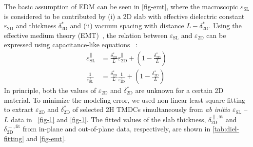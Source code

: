 The basic assumption of EDM can be seen in \autoref{fig-emt},
where the macroscopic $\varepsilon_{\mathrm{SL}}$ is considered to be
contributed by (i) a 2D slab with effective dielectric constant
$\varepsilon_{\mathrm{2D}}$ and thickness $\delta^{*}_{\mathrm{2D}}$
and (ii) vacuum spacing with distance
$L-\delta^{*}_{\mathrm{2D}}$. Using the effective medium theory
(EMT)~\cite{Aspnes_1982_EMT,Markel_2016_EMT}, the relation between
$\varepsilon_{\mathrm{SL}}$ and $\varepsilon_{\mathrm{2D}}$ can be
expressed using capacitance-like
equations~\cite{Matthes_2016_effective_PRB,Laturia_2018_2D_eps} :
\begin{subequations}
  \begin{eqnarray}
    \label{eq:diele-emt-1}
    {\displaystyle \varepsilon_{\mathrm{SL}}^{\parallel}} &= {\displaystyle \frac{\delta^{*}_{\mathrm{2D}}}{L} \varepsilon_{\mathrm{2D}}^{\parallel} + \left(1 - \frac{\delta^{*}_{\mathrm{2D}}}{L} \right)}\\
     \label{eq:diele-emt-2}
    {\displaystyle \frac{1}{\varepsilon_{\mathrm{SL}}^{\perp}}} &= {\displaystyle \frac{\delta^{*}_{\mathrm{2D}}}{L} \frac{1}{\varepsilon_{\mathrm{2D}}^{\perp}} + \left(1 - \frac{\delta^{*}_{\mathrm{2D}}}{L} \right)}
  \end{eqnarray}
\end{subequations}
In principle, both the values of $\varepsilon_{\mathrm{2D}}$ and
$\delta^{*}_{\mathrm{2D}}$ are unknown for a certain 2D material. To
minimize the modeling error, we used non-linear least-square fitting
to extract $\varepsilon_{\mathrm{2D}}$ and $\delta^{*}_{\mathrm{2D}}$
of selected 2H TMDCs simultaneously from \textit{ab initio}
$\varepsilon_{\mathrm{SL}}$ -- $L$ data in ~\autoref{fig-1} and
\autoref{fig-1}. The fitted values of the slab thickness,
$\delta_{\mathrm{2D}}^{\parallel, \mathrm{fit}}$ and
$\delta_{\mathrm{2D}}^{\perp, \mathrm{fit}}$ from in-plane and
out-of-plane data, respectively, are shown in
\autoref{tab:diel-fitting} and \autoref{fig-emt}.

